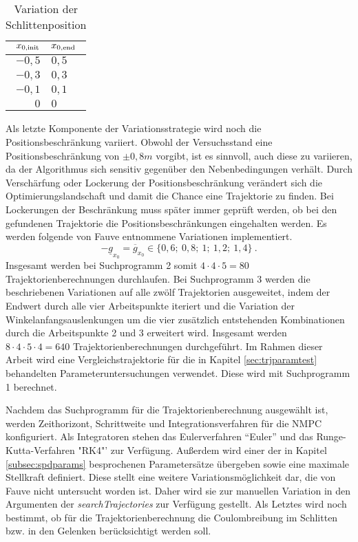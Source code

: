 \begin{table}[h]
	\centering
		\begin{tabular}{r|l}
			$x_{0\mathrm{,init}}$ & $x_{0\mathrm{,end}}$ \\
			\midrule
			$-0,5$ & $0,5$	\\	
			$-0,3$ & $0,3$	\\	
			$-0,1$ & $0,1$	\\	
			   $0$ &   $0$	\\
			
		\end{tabular}
	\caption{Variation der Schlittenposition}
	\label{tab:varpos}
\end{table}

Als letzte Komponente der Variationsstrategie wird noch die Positionsbeschränkung variiert. Obwohl der Versuchsstand eine Positionsbeschränkung von $\pm0,8m$ vorgibt, ist es sinnvoll, auch diese zu variieren, da der Algorithmus sich sensitiv gegenüber den Nebenbedingungen verhält. Durch Verschärfung oder Lockerung der Positionsbeschränkung verändert sich die Optimierungslandschaft und damit die Chance eine Trajektorie zu finden. Bei Lockerungen der Beschränkung muss später immer geprüft werden, ob bei den gefundenen Trajektorie die Positionsbeschränkungen eingehalten werden. Es werden folgende von Fauve \cite{fauve} entnommene Variationen implementiert.
	\[
	-\underline{g}_{x_0} = \overline{g}_{x_0} \in \{ 0,6; \ 0,8; \ 1; \ 1,2; \ 1,4 \}  \ .
\]
Insgesamt werden bei Suchprogramm 2 somit $4 \cdot 4 \cdot 5 = 80$ Trajektorienberechnungen durchlaufen. Bei Suchprogramm 3 werden die beschriebenen Variationen auf alle zwölf Trajektorien ausgeweitet, indem der Endwert durch alle vier Arbeitspunkte iteriert und die Variation der Winkelanfangsauslenkungen um die vier zusätzlich entstehenden Kombinationen durch die Arbeitspunkte 2 und 3 erweitert wird. Insgesamt werden $8 \cdot 4 \cdot 5 \cdot 4 = 640$ Trajektorienberechnungen durchgeführt.
Im Rahmen dieser Arbeit wird eine Vergleichstrajektorie für die in Kapitel \ref{sec:trjparamtest} behandelten Parameteruntersuchungen verwendet. Diese wird mit Suchprogramm 1 berechnet.

Nachdem das Suchprogramm für die Trajektorienberechnung ausgewählt ist, werden Zeithorizont, Schrittweite und Integrationsverfahren für die NMPC konfiguriert. Als Integratoren stehen das Eulerverfahren "`Euler"' und das Runge-Kutta-Verfahren "RK4"' zur Verfügung. Außerdem wird einer der in Kapitel \ref{subsec:spdparams} besprochenen Parametersätze übergeben sowie eine maximale Stellkraft definiert. Diese stellt eine weitere Variationsmöglichkeit dar, die von Fauve \cite{fauve} nicht untersucht worden ist. Daher wird sie zur manuellen Variation in den Argumenten der \textit{searchTrajectories} zur Verfügung gestellt.
Als Letztes wird noch bestimmt, ob für die Trajektorienberechnung die Coulombreibung im Schlitten bzw. in den Gelenken berücksichtigt werden soll. 

